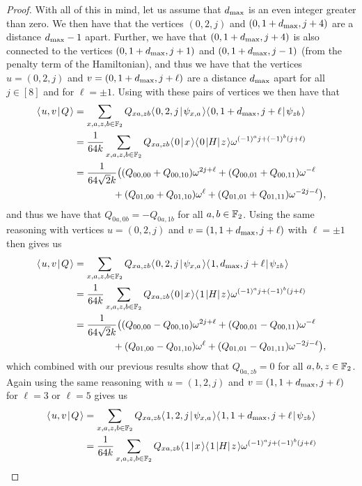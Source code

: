 \documentclass[../thesis-main/thesis-main]{subfiles}
\begin{document}
\begin{proof}
With all of this in mind, let us assume that $d_{\text{max}}$ is an even integer greater than zero.  We then have that the vertices $(0,2,j)$ and $(0,1+d_{\text{max}},j+4)$ are a distance $d_{\text{max}}-1$ apart.  Further, we have that $(0,1+d_{\text{max}},j+4)$ is also connected to the vertices $(0,1+d_{\text{max}},j+1)$ and $(0,1+d_{\text{max}},j-1)$ (from the penalty term of the Hamiltonian), and thus we have that the vertices $u = (0,2,j)$ and $v = (0,1+d_{\text{max}}, j + \ell)$ are a distance $d_{\text{max}}$ apart for all $j\in [8]$ and for $\ell = \pm 1$.  Using  with these pairs of vertices we then have that 
\begin{align}
  \langle\mspace{2mu} u,v \mspace{2mu} | \mspace{2mu} Q\mspace{2mu} \rangle &= \sum_{x,a,z,b\in \mathbb{F}_2} Q_{xa,zb} \langle\mspace{2mu} 0,2,j \mspace{2mu} | \mspace{2mu} \psi_{x,a}\mspace{2mu} \rangle\langle\mspace{2mu} 0,1+d_{\text{max}},j+\ell \mspace{2mu} | \mspace{2mu} \psi_{zb}\mspace{2mu} \rangle\\
  &=\frac{1}{64 k} \sum_{x,a,z,b\in \mathbb{F}_2} Q_{xa,zb} \langle\mspace{2mu} 0 \mspace{2mu} | \mspace{2mu} x\mspace{2mu} \rangle \langle\mspace{2mu} 0 \mspace{2mu} | H |\mspace{2mu} z \mspace{2mu} \rangle \omega^{(-1)^a j+ (-1)^b (j+\ell)}\\
  &= \frac{1}{64\sqrt{2}k} \big( (Q_{00,00} + Q_{00,10}) \omega^{2j + \ell} + (Q_{00,01} + Q_{00,11})\omega^{-\ell} \nonumber\\
  &\qquad \qquad + (Q_{01,00} + Q_{01,10})\omega^{\ell} + (Q_{01,01} + Q_{01,11})\omega^{-2j - \ell}\big),
\end{align}
and thus we have that $Q_{0a,0b} = - Q_{0a,1b}$ for all $a,b\in \mathbb{F}_2$.  Using the same reasoning with vertices $u =(0,2,j)$ and $v =(1,1+d_{\text{max}}, j+\ell)$ with $\ell =\pm 1$ then gives us 
\begin{align}
  \langle\mspace{2mu} u,v \mspace{2mu} | \mspace{2mu} Q\mspace{2mu} \rangle &= \sum_{x,a,z,b\in \mathbb{F}_2} Q_{xa,zb} \langle\mspace{2mu} 0,2,j \mspace{2mu} | \mspace{2mu} \psi_{x,a}\mspace{2mu} \rangle\langle\mspace{2mu} 1,d_{\text{max}},j+\ell \mspace{2mu} | \mspace{2mu} \psi_{zb}\mspace{2mu} \rangle\\
  &=\frac{1}{64 k} \sum_{x,a,z,b\in \mathbb{F}_2} Q_{xa,zb} \langle\mspace{2mu} 0 \mspace{2mu} | \mspace{2mu} x\mspace{2mu} \rangle \langle\mspace{2mu} 1 \mspace{2mu} | H |\mspace{2mu} z \mspace{2mu} \rangle \omega^{(-1)^a j+ (-1)^b (j+\ell)}\\
  &= \frac{1}{64\sqrt{2} k} \big( (Q_{00,00} - Q_{00,10}) \omega^{2j + \ell} + (Q_{00,01} - Q_{00,11})\omega^{-\ell} \nonumber\\
  &\qquad \qquad + (Q_{01,00} - Q_{01,10})\omega^{\ell} + (Q_{01,01} - Q_{01,11})\omega^{-2j - \ell}\big),
\end{align}
which combined with our previous results show that $Q_{0a,zb} = 0$ for all $a,b,z\in \mathbb{F}_2$.  Again using the same reasoning with $u = (1,2,j)$ and $v= (1,1+d_{\text{max}}, j+\ell)$ for $\ell =3$ or $\ell = 5$ gives us 
\begin{align}
  \braket{u,v}{Q} &= \sum_{x,a,z,b\in \FF_2} Q_{xa,zb} \braket{1,2,j}{\psi_{x,a}}\braket{1,1+\dmax,j+\ell}{\psi_{zb}}\\
  &=\frac{1}{64 k} \sum_{x,a,z,b\in \FF_2} Q_{xa,zb} \braket{1}{x} \bra{1} H \ket{z} \omega^{(-1)^a j+ (-1)^b (j+\ell)}\\

\end{align}
\end{proof}
\end{document}
